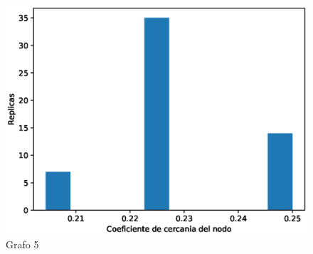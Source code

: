 \documentclass{article}
\begin{document}
\begin{figure}[H]
    \includegraphics[scale=0.6]{hist-agrupamiento-5}
    \caption{Grafo 5}
    \label{fig:matriz}
\end{figure}
\end{document}
